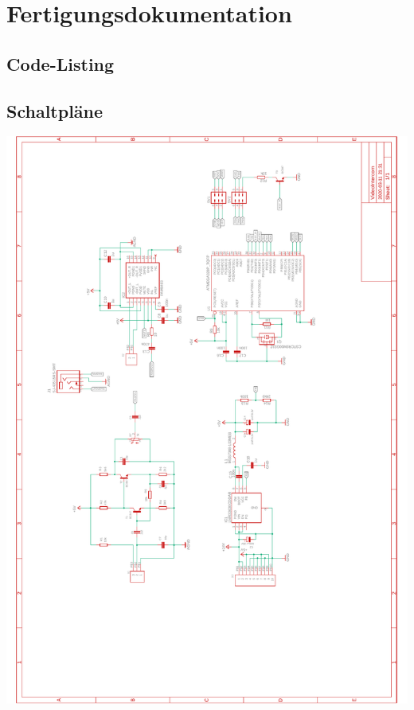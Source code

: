 \documentclass[a4paper, twoside, 12pt, openright
]{memoir}
\begin{document}
\chapter{Fertigungsdokumentation}
\section{Code-Listing}

\section{Schaltpläne}
\includegraphics[width=15.5cm]{images/appendix/schematics.pdf}
\end{document}
